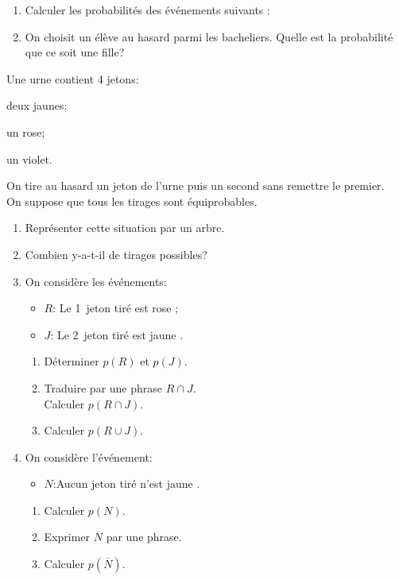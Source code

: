 \begin{exercice}
\begin{enumerate}
         \item Calculer les probabilités des événements suivants :
        \item   On choisit un élève au hasard parmi les bacheliers.
       Quelle est la probabilité que ce soit une fille?
\end{enumerate}   
\end{exercice}
\columnbreak
\begin{exercice}
Une urne contient 4 jetons: 
\begin{colitemize}{3} \item deux jaunes; \item un rose; \item un violet. \end{colitemize}
 On tire au hasard un jeton de l'urne puis un second sans remettre le premier. \\On suppose que tous les tirages sont équiprobables.
\begin{enumerate}
\item Représenter cette situation par un arbre.
\item Combien y-a-t-il de tirages possibles?
\item On considère les événements:
\begin{itemize}
  \item $R$: \og Le 1\ier\ jeton tiré est rose \fg;
  \item $J$: \og Le 2\ieme\ jeton tiré est jaune \fg.
 \end{itemize}
 \vspace{-1.6em}
\begin{enumerate}
\item Déterminer $p(R)$ et $p(J)$.
\item Traduire par une phrase $R \cap J$. \\
Calculer $p(R \cap J)$.
\item Calculer $p(R \cup J)$.
\end{enumerate}
\vspace{-1.5em}
\item On considère l'événement:
\begin{itemize}
\item $N$:\og Aucun jeton tiré n'est jaune \fg.
\end{itemize} 
\vspace{-1.5em}
\begin{enumerate}
\item Calculer $p(N)$.
\item Exprimer $\overline{N}$ par une phrase.
\item Calculer $p\left(\overline{N}\right)$.
\end{enumerate}
\vspace{-1.6em}
\end{enumerate}
\end{exercice}



